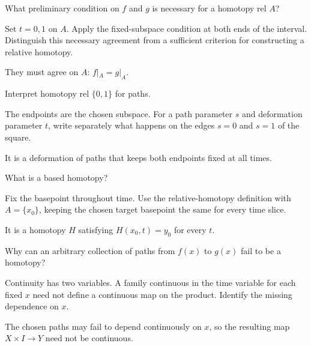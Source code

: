 \begin{exercise}\label{exr:viii01-14}
What preliminary condition on \(f\) and \(g\) is necessary for a homotopy rel \(A\)?
\end{exercise}
\begin{hint}Set \(t=0,1\) on \(A\).
Apply the fixed-subspace condition at both ends of the interval. Distinguish this necessary agreement from a sufficient criterion for constructing a relative homotopy.
\end{hint}
\begin{solution}
They must agree on \(A\): \(f|_A=g|_A\).
\end{solution}

\begin{exercise}\label{exr:viii01-15}
Interpret homotopy rel \(\{0,1\}\) for paths.
\end{exercise}
\begin{hint}The endpoints are the chosen subspace.
For a path parameter \(s\) and deformation parameter \(t\), write separately what happens on the edges \(s=0\) and \(s=1\) of the square.
\end{hint}
\begin{solution}
It is a deformation of paths that keeps both endpoints fixed at all times.
\end{solution}

\begin{exercise}\label{exr:viii01-16}
What is a based homotopy?
\end{exercise}
\begin{hint}Fix the basepoint throughout time.
Use the relative-homotopy definition with \(A=\{x_0\}\), keeping the chosen target basepoint the same for every time slice.
\end{hint}
\begin{solution}
It is a homotopy \(H\) satisfying \(H(x_0,t)=y_0\) for every \(t\).
\end{solution}

\begin{exercise}\label{exr:viii01-17}
Why can an arbitrary collection of paths from \(f(x)\) to \(g(x)\) fail to be a homotopy?
\end{exercise}
\begin{hint}Continuity has two variables.
A family continuous in the time variable for each fixed \(x\) need not define a continuous map on the product. Identify the missing dependence on \(x\).
\end{hint}
\begin{solution}
The chosen paths may fail to depend continuously on \(x\), so the resulting
map \(X\times I\to Y\) need not be continuous.
\end{solution}

